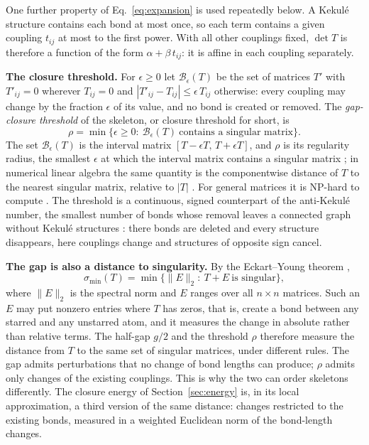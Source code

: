 \documentclass[11pt]{article}
\newcommand{\Bx}{\mathcal{B}}
\begin{document}
One further property of Eq.~\eqref{eq:expansion} is used repeatedly below. A Kekul\'e structure contains each bond at most once, so each term contains a given coupling $t_{ij}$ at most to the first power. With all other couplings fixed, $\det T$ is therefore a function of the form $\alpha+\beta\,t_{ij}$: it is affine in each coupling separately.

\textbf{The closure threshold.} For $\epsilon\ge0$ let $\Bx_\epsilon(T)$ be the set of matrices $T'$ with $T'_{ij}=0$ wherever $T_{ij}=0$ and $|T'_{ij}-T_{ij}|\le\epsilon\,T_{ij}$ otherwise: every coupling may change by the fraction $\epsilon$ of its value, and no bond is created or removed. The \emph{gap-closure threshold} of the skeleton, or closure threshold for short, is
\begin{equation}
\rho=\min\bigl\{\epsilon\ge0:\ \Bx_\epsilon(T)\ \text{contains a singular matrix}\bigr\}.
\label{eq:rho}
\end{equation}
The set $\Bx_\epsilon(T)$ is the interval matrix $[T-\epsilon T,\,T+\epsilon T]$, and $\rho$ is its regularity radius, the smallest $\epsilon$ at which the interval matrix contains a singular matrix \citep{PoljakRohn1993,Rohn2009,HartmanHladik2018}; in numerical linear algebra the same quantity is the componentwise distance of $T$ to the nearest singular matrix, relative to $|T|$ \citep{Rump1999}. For general matrices it is NP-hard to compute \citep{PoljakRohn1993}. The threshold is a continuous, signed counterpart of the anti-Kekul\'e number, the smallest number of bonds whose removal leaves a connected graph without Kekul\'e structures \citep{Hayat2021}: there bonds are deleted and every structure disappears, here couplings change and structures of opposite sign cancel.

\textbf{The gap is also a distance to singularity.} By the Eckart--Young theorem \citep{EckartYoung1936},
\[
\sigma_{\min}(T)=\min\bigl\{\|E\|_2:\ T+E\ \text{is singular}\bigr\},
\]
where $\|E\|_2$ is the spectral norm and $E$ ranges over all $n\times n$ matrices. Such an $E$ may put nonzero entries where $T$ has zeros, that is, create a bond between any starred and any unstarred atom, and it measures the change in absolute rather than relative terms. The half-gap $g/2$ and the threshold $\rho$ therefore measure the distance from $T$ to the same set of singular matrices, under different rules. The gap admits perturbations that no change of bond lengths can produce; $\rho$ admits only changes of the existing couplings. This is why the two can order skeletons differently. The closure energy of Section~\ref{sec:energy} is, in its local approximation, a third version of the same distance: changes restricted to the existing bonds, measured in a weighted Euclidean norm of the bond-length changes.
\end{document}
